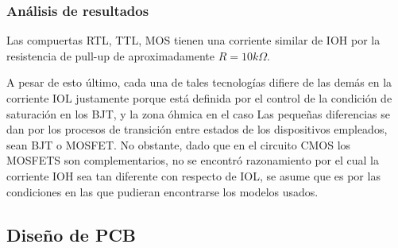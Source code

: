 \subsubsection{An\'alisis de resultados}
Las compuertas RTL, TTL, MOS tienen una corriente similar de IOH por la resistencia de pull-up de aproximadamente $R = 10k \Omega$. 

A pesar de esto \'ultimo, cada una de tales tecnolog\'ias difiere de las dem\'as en la corriente IOL justamente porque est\'a definida por el control de la condici\'on de saturaci\'on en los BJT, y la zona \'ohmica en el caso
Las peque\~nas diferencias se dan por los procesos de transici\'on entre estados de los dispositivos empleados, sean BJT o MOSFET. 
No obstante, dado que en el circuito CMOS los MOSFETS son complementarios, no se encontr\'o razonamiento por el cual la corriente IOH sea tan diferente con respecto de IOL, se asume que es por las condiciones
en las que pudieran encontrarse los modelos usados.

\subsection{Dise\~no de PCB}

